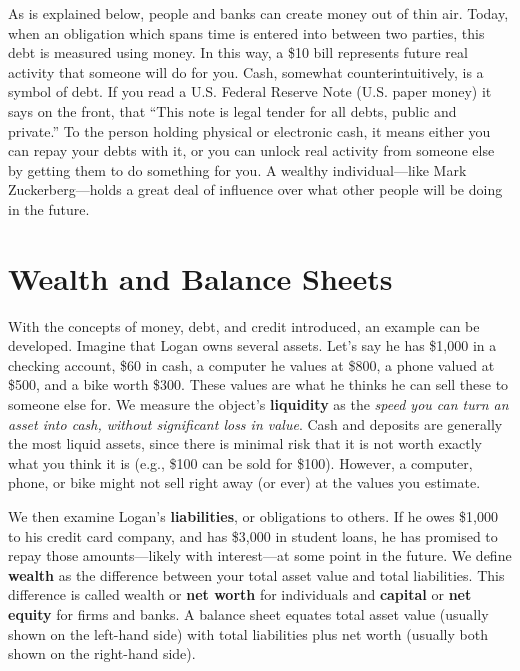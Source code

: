 \documentclass[
]{book}
\begin{document}
As is explained below, people and banks can create money out of thin air. Today, when an obligation which spans time is entered into between two parties, this debt is measured using money. In this way, a \$10 bill represents future real activity that someone will do for you. Cash, somewhat counterintuitively, is a symbol of debt. If you read a U.S. Federal Reserve Note (U.S. paper money) it says on the front, that ``This note is legal tender for all debts, public and private.'' To the person holding physical or electronic cash, it means either you can repay your debts with it, or you can unlock real activity from someone else by getting them to do something for you. A wealthy individual---like Mark Zuckerberg---holds a great deal of influence over what other people will be doing in the future.

\hypertarget{wealth-and-balance-sheets}{%
\section{Wealth and Balance Sheets}\label{wealth-and-balance-sheets}}

With the concepts of money, debt, and credit introduced, an example can be developed. Imagine that Logan owns several assets. Let's say he has \$1,000 in a checking account, \$60 in cash, a computer he values at \$800, a phone valued at \$500, and a bike worth \$300. These values are what he thinks he can sell these to someone else for. We measure the object's \textbf{liquidity} as the \emph{speed you can turn an asset into cash, without significant loss in value}. Cash and deposits are generally the most liquid assets, since there is minimal risk that it is not worth exactly what you think it is (e.g., \$100 can be sold for \$100). However, a computer, phone, or bike might not sell right away (or ever) at the values you estimate.

We then examine Logan's \textbf{liabilities}, or obligations to others. If he owes \$1,000 to his credit card company, and has \$3,000 in student loans, he has promised to repay those amounts---likely with interest---at some point in the future. We define \textbf{wealth} as the difference between your total asset value and total liabilities. This difference is called wealth or \textbf{net worth} for individuals and \textbf{capital} or \textbf{net equity} for firms and banks. A balance sheet equates total asset value (usually shown on the left-hand side) with total liabilities plus net worth (usually both shown on the right-hand side).
\end{document}
